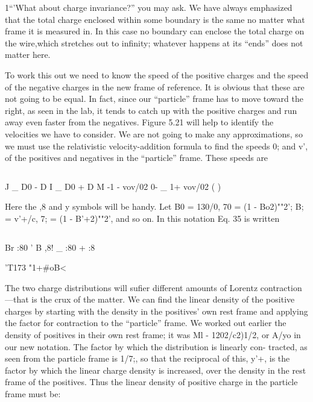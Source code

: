 1``'What about charge invariance?'' you may ask. We have always emphasized that
the total charge enclosed within some boundary is the same no matter what frame it is
measured in. In this case no boundary can enclose the total charge on the wire,which
stretches out to infinity; whatever happens at its ``ends'' does not matter here.

To work this out we need to know the speed of the positive charges
and the speed of the negative charges in the new frame of reference.
It is obvious that these are not going to be equal. In fact, since our
``particle'' frame has to move toward the right, as seen in the lab, it
tends to catch up with the positive charges and run away even faster
from the negatives. Figure 5.21 will help to identify the velocities we
have to consider. We are not going to make any approximations, so
we must use the relativistic velocity-addition formula to find the
speeds 0; and v', of the positives and negatives in the ``particle''
frame. These speeds are

\begin{equation}
\end{equation}

J _ D0 - D I _ D0 + D 
M -1 - vov/02 0- _ 1+ vov/02 ( )

Here the ,8 and y symbols will be handy. Let B0 = 130/0, 70 =
(1 - Bo2)""2'; B; = v'+/c, 7; = (1 - B'+2)""2', and so on. In
this notation Eq. 35 is written

\begin{equation}
\end{equation}

Br :80 ' B ,8! _ :80 + :8 

'T173 "1+#oB<

The two charge distributions will sufier different amounts of
Lorentz contraction---that is the crux of the matter. We can find the
linear density of the positive charges by starting with the density in
the positives' own rest frame and applying the factor for contraction
to the ``particle'' frame. We worked out earlier the density of positives
in their own rest frame; it was Ml - 1202/c2)1/2, or A/yo in our
new notation. The factor by which the distribution is linearly con-
tracted, as seen from the particle frame is 1/7;, so that the reciprocal
of this, y'+, is the factor by which the linear charge density is increased,
over the density in the rest frame of the positives. Thus the linear
density of positive charge in the particle frame must be:

\begin{equation}
\end{equation}

